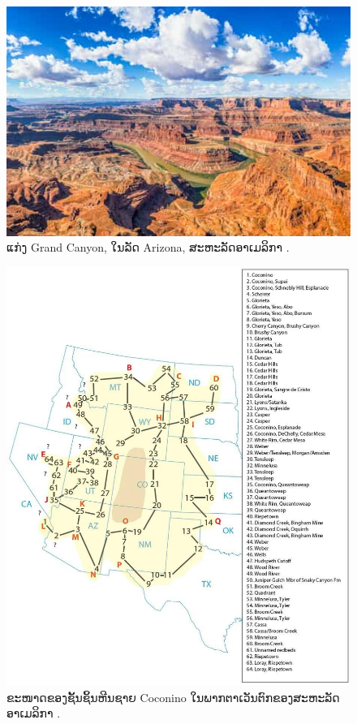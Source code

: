 \documentclass[10pt,twocolumn,letterpaper]{article}
\begin{document}
\begin{figure}[b]
\begin{center}
   \includegraphics[width=1\linewidth]{grand-canyon.jpg}

\end{center}
   \caption{ແກ່ງ Grand Canyon, ໃນລັດ Arizona, ສະຫະລັດອາເມລິກາ \cite{49}.}
\label{fig:2}
\label{fig:onecol}
\end{figure}

\begin{figure}[t]
\begin{center}
   \includegraphics[width=1\linewidth]{coconino.jpg}
\end{center}
   \caption{ຂະໜາດຂອງຊັ້ນຊິ້ນຫີນຊາຍ Coconino ໃນພາກຕາເວັນຕົກຂອງສະຫະລັດອາເມລິກາ \cite{21}.}
\label{fig:3}
\label{fig:onecol}
\end{figure}
\end{document}
